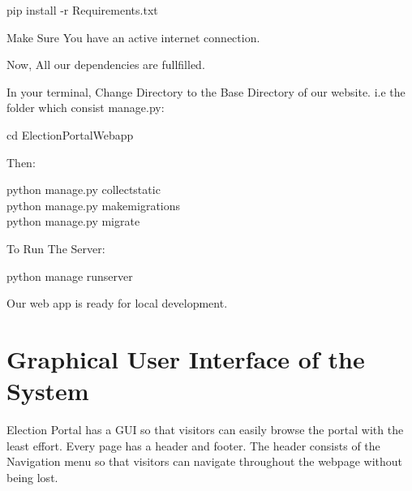 \documentclass[12pt]{article}
\begin{document}
\begin{center}
pip install -r Requirements.txt
\end{center}
    
   
Make Sure You have an active internet connection.

Now, All our dependencies are fullfilled.

In your terminal, Change Directory to the Base Directory of our website. i.e the folder which consist manage.py:

\begin{center}
cd ElectionPortalWebapp
\end{center}

    
    
Then:
\begin{center}
    python manage.py collectstatic\\
    python manage.py makemigrations\\
    python manage.py migrate\\
\end{center}




To Run The Server:

\begin{center}
python manage runserver
\end{center}

Our web app is ready for local development.
    
\newpage
    
\section{Graphical User Interface of the System}
Election Portal has a GUI so that visitors can easily browse the portal with the least effort. Every page has a header and footer. The header consists of the Navigation menu so that visitors can navigate throughout the webpage without being lost.
\end{document}
